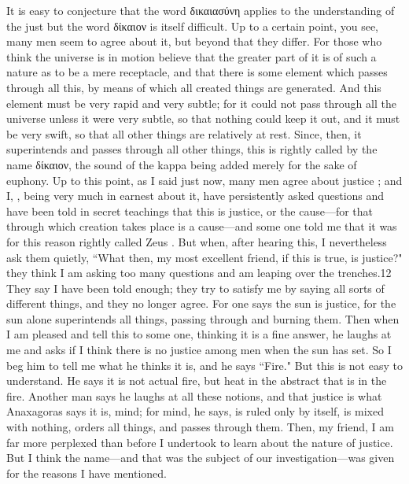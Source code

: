 {{{{It is easy to conjecture that the word δικαιασύνη applies to the understanding  of the just  but the word δίκαιον  is itself difficult. Up to a certain point, you see, many men seem to agree about it, but beyond that they differ.  For those who think the universe is in motion believe that the greater part of it is of such a nature as to be a mere receptacle, and that there is some element which passes through all this, by means of which all created things are generated. And this element must be very rapid and very subtle; for it could not pass through all the universe unless it were very subtle, so that nothing could keep it out, and it must be very swift, so that all other things are relatively at rest. Since, then, it superintends and passes through  all other things,  this is rightly called by the name δίκαιον, the sound of the kappa being added merely for the sake of euphony. Up to this point, as I said just now, many men agree about justice ;  and I, \hermogenesspeaks, being very much in earnest about it, have persistently asked questions and have been told in secret teachings that this is justice, or the cause—for that through which creation takes place is a cause—and some one told me that it was for this reason rightly called Zeus . But when, after hearing this, I nevertheless ask them quietly, ``What then, my most excellent friend, if this is true, is justice?" they think I am asking too many questions and am leaping over the trenches.12  They say I have been told enough; they try to satisfy me by saying all sorts of different things, and they no longer agree. For one says the sun is justice, for the sun alone superintends all things, passing through and burning  them. Then when I am pleased and tell this to some one, thinking it is a fine answer, he laughs at me and asks if I think there is no justice among men when the sun has set. So I beg him to tell me what he thinks it is,  and he says ``Fire." But this is not easy to understand. He says it is not actual fire, but heat in the abstract that is in the fire. Another man says he laughs at all these notions, and that justice is what Anaxagoras says it is, mind; for mind, he says, is ruled only by itself, is mixed with nothing, orders all things, and passes through them. Then, my friend, I am far more perplexed than before I undertook to learn about the nature of justice.  But I think the name—and that was the subject of our investigation—was given for the reasons I have mentioned.
}}}}
